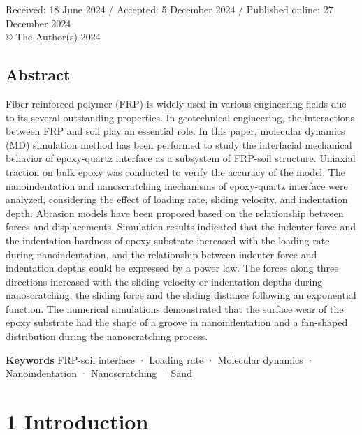 \documentclass{article}
\begin{document}
\noindent Received: 18 June 2024 / Accepted: 5 December 2024 / Published online: 27 December 2024\\
© The Author(s) 2024\par

\subsection*{Abstract}
Fiber-reinforced polymer (FRP) is widely used in various engineering fields due to its several outstanding properties. In geotechnical engineering, the interactions between FRP and soil play an essential role. In this paper, molecular dynamics (MD) simulation method has been performed to study the interfacial mechanical behavior of epoxy-quartz interface as a subsystem of FRP-soil structure. Uniaxial traction on bulk epoxy was conducted to verify the accuracy of the model. The nanoindentation and nanoscratching mechanisms of epoxy-quartz interface were analyzed, considering the effect of loading rate, sliding velocity, and indentation depth. Abrasion models have been proposed based on the relationship between forces and displacements. Simulation results indicated that the indenter force and the indentation hardness of epoxy substrate increased with the loading rate during nanoindentation, and the relationship between indenter force and indentation depths could be expressed by a power law. The forces along three directions increased with the sliding velocity or indentation depths during nanoscratching, the sliding force and the sliding distance following an exponential function. The numerical simulations demonstrated that the surface wear of the epoxy substrate had the shape of a groove in nanoindentation and a fan-shaped distribution during the nanoscratching process.

\noindent \textbf{Keywords} FRP-soil interface · Loading rate · Molecular dynamics · Nanoindentation · Nanoscratching · Sand

\section*{1 Introduction}
\end{document}
